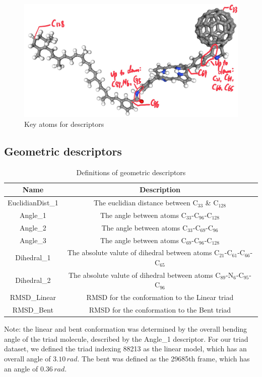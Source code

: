 \documentclass[a4paper]{article}
\begin{document}
\begin{figure}[H]
    \centering
    \includegraphics[width=0.75\linewidth]{projects/Gustave_Li/Docs/Key-atoms.jpg}
    \caption{Key atoms for descriptors}
    \label{fig:key_atoms}
\end{figure}

\subsection{Geometric descriptors}
\begin{table}[ht]
    \centering
    \caption{Definitions of geometric descriptors}
    \begin{tabular}{c|c}
    \hline \hline
       \textbf{Name}  & \textbf{Description} \\
       \hline \hline
       EuclidianDist\_1 & The euclidian distance between \(\text{C}_{33}\) \& \(\text{C}_{128}\) \\
       Angle\_1 & The angle between atoms \(\text{C}_{33}\)-\(\text{C}_{96}\)-\(\text{C}_{128}\) \\
       Angle\_2 & The angle between atoms \(\text{C}_{33}\)-\(\text{C}_{69}\)-\(\text{C}_{96}\) \\
       Angle\_3 & The angle between atoms \(\text{C}_{69}\)-\(\text{C}_{96}\)-\(\text{C}_{128}\) \\
       Dihedral\_1 & The absolute valute of dihedral between atoms \(\text{C}_{21}\)-\(\text{C}_{61}\)-\(\text{C}_{66}\)-\(\text{C}_{65}\) \\
       Dihedral\_2 & The absolute valute of dihedral between atoms \(\text{C}_{89}\)-\(\text{N}_{6}\)-\(\text{C}_{95}\)-\(\text{C}_{96}\) \\
       RMSD\_Linear & RMSD for the conformation to the Linear triad \\
       RMSD\_Bent & RMSD for the conformation to the Bent triad \\
       \hline \hline
    \end{tabular}
    
    \label{tab:descriptors}
    \vspace{1ex}
    {\raggedright Note: the linear and bent conformation was determined by the overall bending angle of the triad molecule, described by the Angle\_1 descriptor. For our triad dataset, we defined the triad indexing 88213 as the linear model, which has an overall angle of \(3.10\,rad\). The bent was defined as the 29685th frame, which has an angle of \(0.36\,rad\). \par}
\end{table}
\end{document}
